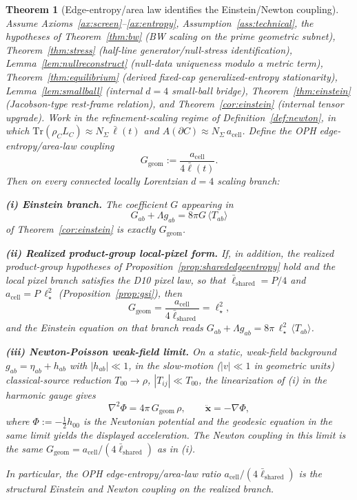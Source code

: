 \documentclass[11pt]{article}
\newtheorem{theorem}{Theorem}[section]
\begin{document}
\begin{theorem}[Edge-entropy/area law identifies the Einstein/Newton coupling]\label{thm:edge-entropy-newton-coupling}
Assume Axioms~\ref{ax:screen}--\ref{ax:entropy}, Assumption~\ref{ass:technical}, the hypotheses of Theorem~\ref{thm:bw} (BW scaling on the prime geometric subnet), Theorem~\ref{thm:stress} (half-line generator/null-stress identification), Lemma~\ref{lem:nullreconstruct} (null-data uniqueness modulo a metric term), Theorem~\ref{thm:equilibrium} (derived fixed-cap generalized-entropy stationarity), Lemma~\ref{lem:smallball} (internal \(d=4\) small-ball bridge), Theorem~\ref{thm:einstein} (Jacobson-type rest-frame relation), and Theorem~\ref{cor:einstein} (internal tensor upgrade). Work in the refinement-scaling regime of Definition~\ref{def:newton}, in which \(\mathrm{Tr}(\rho_C L_C)\approx N_\Sigma\,\bar\ell(t)\) and \(A(\partial C)\approx N_\Sigma\,a_{\mathrm{cell}}\). Define the OPH edge-entropy/area-law coupling
\[
G_{\mathrm{geom}}:=\frac{a_{\mathrm{cell}}}{4\bar\ell(t)}.
\]
Then on every connected locally Lorentzian \(d=4\) scaling branch:

\textbf{(i) Einstein branch.} The coefficient \(G\) appearing in
\[
G_{ab}+\Lambda g_{ab}=8\pi G\,\langle T_{ab}\rangle
\]
of Theorem~\ref{cor:einstein} is exactly \(G_{\mathrm{geom}}\).

\textbf{(ii) Realized product-group local-pixel form.} If, in addition, the realized product-group hypotheses of Proposition~\ref{prop:sharededgeentropy} hold and the local pixel branch satisfies the D10 pixel law, so that \(\bar\ell_{\mathrm{shared}}=P/4\) and \(a_{\mathrm{cell}}=P\,\ell_\star^2\) (Proposition~\ref{prop:gsi}), then
\[
G_{\mathrm{geom}}=\frac{a_{\mathrm{cell}}}{4\bar\ell_{\mathrm{shared}}}=\ell_\star^2,
\]
and the Einstein equation on that branch reads \(G_{ab}+\Lambda g_{ab}=8\pi\,\ell_\star^2\,\langle T_{ab}\rangle\).

\textbf{(iii) Newton-Poisson weak-field limit.} On a static, weak-field background \(g_{ab}=\eta_{ab}+h_{ab}\) with \(|h_{ab}|\ll 1\), in the slow-motion (\(|v|\ll 1\) in geometric units) classical-source reduction \(T_{00}\to\rho\), \(|T_{ij}|\ll T_{00}\), the linearization of (i) in the harmonic gauge gives
\[
\nabla^2\Phi=4\pi\,G_{\mathrm{geom}}\,\rho,
\qquad
\ddot{\mathbf x}=-\nabla\Phi,
\]
where \(\Phi:=-\tfrac12 h_{00}\) is the Newtonian potential and the geodesic equation in the same limit yields the displayed acceleration. The Newton coupling in this limit is the same \(G_{\mathrm{geom}}=a_{\mathrm{cell}}/(4\bar\ell_{\mathrm{shared}})\) as in (i).

In particular, the OPH edge-entropy/area-law ratio \(a_{\mathrm{cell}}/(4\bar\ell_{\mathrm{shared}})\) is the structural Einstein and Newton coupling on the realized branch.
\end{theorem}
\end{document}
